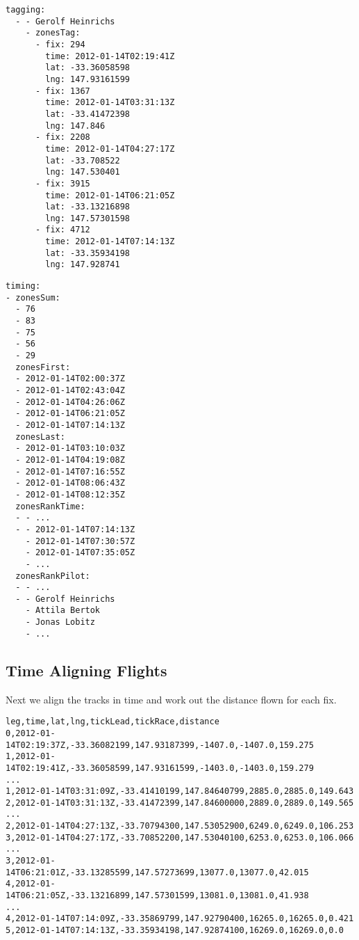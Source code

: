\documentclass[gap.tex]{subfiles}
\begin{document}
\begin{lstlisting}[caption={Selected taggings, one for each zone, \texttt{tagging} nodes of \texttt{*.tag-zone.yaml}.}]
tagging:
  - - Gerolf Heinrichs
    - zonesTag:
      - fix: 294
        time: 2012-01-14T02:19:41Z
        lat: -33.36058598
        lng: 147.93161599
      - fix: 1367
        time: 2012-01-14T03:31:13Z
        lat: -33.41472398
        lng: 147.846
      - fix: 2208
        time: 2012-01-14T04:27:17Z
        lat: -33.708522
        lng: 147.530401
      - fix: 3915
        time: 2012-01-14T06:21:05Z
        lat: -33.13216898
        lng: 147.57301598
      - fix: 4712
        time: 2012-01-14T07:14:13Z
        lat: -33.35934198
        lng: 147.928741
\end{lstlisting}

\begin{lstlisting}[caption={The count of pilots tagging zones and the times of these taggings, \texttt{timing} nodes of \texttt{*.tag-zone.yaml}.}]
timing:
- zonesSum:
  - 76
  - 83
  - 75
  - 56
  - 29
  zonesFirst:
  - 2012-01-14T02:00:37Z
  - 2012-01-14T02:43:04Z
  - 2012-01-14T04:26:06Z
  - 2012-01-14T06:21:05Z
  - 2012-01-14T07:14:13Z
  zonesLast:
  - 2012-01-14T03:10:03Z
  - 2012-01-14T04:19:08Z
  - 2012-01-14T07:16:55Z
  - 2012-01-14T08:06:43Z
  - 2012-01-14T08:12:35Z
  zonesRankTime:
  - - ...
  - - 2012-01-14T07:14:13Z
    - 2012-01-14T07:30:57Z
    - 2012-01-14T07:35:05Z
    - ...
  zonesRankPilot:
  - - ...
  - - Gerolf Heinrichs
    - Attila Bertok
    - Jonas Lobitz
    - ...
\end{lstlisting}

\newpage
\subsection{Time Aligning Flights}

Next we align the tracks in time and work out the distance flown for each fix.

\begin{lstlisting}[caption={Fixes aligned in time with distance flown, rows of \texttt{*.align-time.csv}}]
leg,time,lat,lng,tickLead,tickRace,distance
0,2012-01-14T02:19:37Z,-33.36082199,147.93187399,-1407.0,-1407.0,159.275
1,2012-01-14T02:19:41Z,-33.36058599,147.93161599,-1403.0,-1403.0,159.279
...
1,2012-01-14T03:31:09Z,-33.41410199,147.84640799,2885.0,2885.0,149.643
2,2012-01-14T03:31:13Z,-33.41472399,147.84600000,2889.0,2889.0,149.565
...
2,2012-01-14T04:27:13Z,-33.70794300,147.53052900,6249.0,6249.0,106.253
3,2012-01-14T04:27:17Z,-33.70852200,147.53040100,6253.0,6253.0,106.066
...
3,2012-01-14T06:21:01Z,-33.13285599,147.57273699,13077.0,13077.0,42.015
4,2012-01-14T06:21:05Z,-33.13216899,147.57301599,13081.0,13081.0,41.938
...
4,2012-01-14T07:14:09Z,-33.35869799,147.92790400,16265.0,16265.0,0.421
5,2012-01-14T07:14:13Z,-33.35934198,147.92874100,16269.0,16269.0,0.0
\end{lstlisting}
\end{document}
